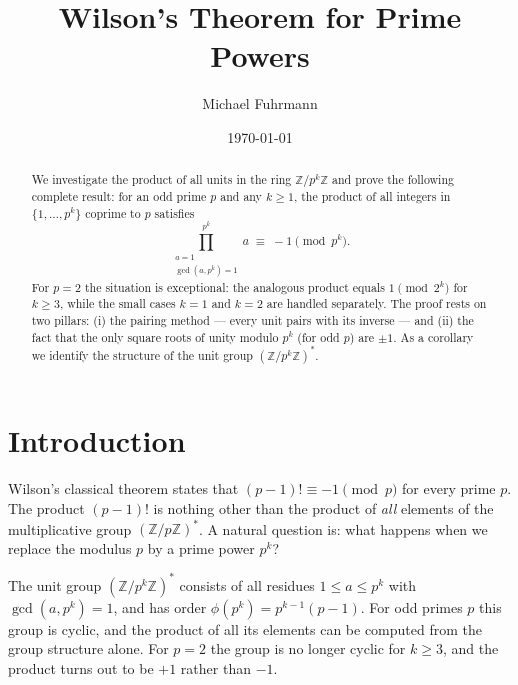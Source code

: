 \documentclass[12pt,a4paper]{amsart}
\theoremstyle{definition}
\newcommand{\Z}{\mathbb{Z}}
\begin{document}

\title{Wilson's Theorem for Prime Powers}

\author{Michael Fuhrmann}
\address{Specialist Mathematics Project, Build 63}
\date{\today}

\begin{abstract}
We investigate the product of all units in the ring $\Z/p^k\Z$ and prove the
following complete result: for an odd prime $p$ and any $k \geq 1$, the product
of all integers in $\{1, \ldots, p^k\}$ coprime to $p$ satisfies
\[
  \prod_{\substack{a=1\\\gcd(a,p^k)=1}}^{p^k} a \;\equiv\; -1 \pmod{p^k}.
\]
For $p = 2$ the situation is exceptional: the analogous product equals $1 \pmod{2^k}$
for $k \geq 3$, while the small cases $k = 1$ and $k = 2$ are handled separately.
The proof rests on two pillars: (i) the pairing method — every unit pairs with its
inverse — and (ii) the fact that the only square roots of unity modulo $p^k$
(for odd $p$) are $\pm 1$.  As a corollary we identify the structure of the
unit group $(\Z/p^k\Z)^*$.
\end{abstract}

\maketitle
\tableofcontents

\section{Introduction}

Wilson's classical theorem states that $(p-1)! \equiv -1 \pmod{p}$ for every
prime $p$.  The product $(p-1)!$ is nothing other than the product of \emph{all}
elements of the multiplicative group $(\Z/p\Z)^*$.
A natural question is: what happens when we replace the modulus $p$ by a
prime power $p^k$?

The unit group $(\Z/p^k\Z)^*$ consists of all residues $1 \leq a \leq p^k$
with $\gcd(a, p^k) = 1$, and has order $\phi(p^k) = p^{k-1}(p-1)$.
For odd primes $p$ this group is cyclic, and the product of all its elements
can be computed from the group structure alone.
For $p = 2$ the group is no longer cyclic for $k \geq 3$, and the product
turns out to be $+1$ rather than $-1$.
\end{document}
